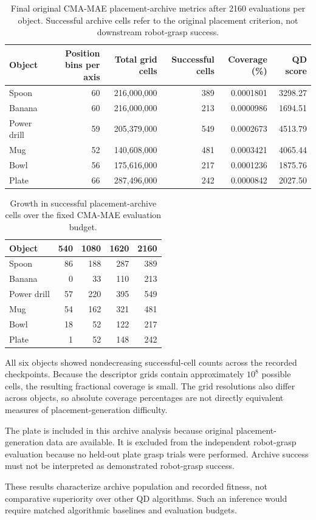 \begin{table}[t]
\centering
\caption{Final original CMA-MAE placement-archive metrics after 2160 evaluations per object. Successful archive cells refer to the original placement criterion, not downstream robot-grasp success.}
\label{tab:qd_archive_results}
\small
\begin{tabular}{lrrrrr}
\hline
Object & Position bins per axis & Total grid cells & Successful cells & Coverage (\%) & QD score \\
\hline
Spoon & 60 & 216,000,000 & 389 & 0.0001801 & 3298.27 \\
Banana & 60 & 216,000,000 & 213 & 0.0000986 & 1694.51 \\
Power drill & 59 & 205,379,000 & 549 & 0.0002673 & 4513.79 \\
Mug & 52 & 140,608,000 & 481 & 0.0003421 & 4065.44 \\
Bowl & 56 & 175,616,000 & 217 & 0.0001236 & 1875.76 \\
Plate & 66 & 287,496,000 & 242 & 0.0000842 & 2027.50 \\
\hline
\end{tabular}
\end{table}

\begin{table}[t]
\centering
\caption{Growth in successful placement-archive cells over the fixed CMA-MAE evaluation budget.}
\label{tab:qd_archive_growth}
\small
\begin{tabular}{lrrrr}
\hline
Object & 540 & 1080 & 1620 & 2160 \\
\hline
Spoon & 86 & 188 & 287 & 389 \\
Banana & 0 & 33 & 110 & 213 \\
Power drill & 57 & 220 & 395 & 549 \\
Mug & 54 & 162 & 321 & 481 \\
Bowl & 18 & 52 & 122 & 217 \\
Plate & 1 & 52 & 148 & 242 \\
\hline
\end{tabular}
\end{table}

All six objects showed nondecreasing successful-cell counts across the recorded checkpoints. Because the descriptor grids contain approximately $10^8$ possible cells, the resulting fractional coverage is small. The grid resolutions also differ across objects, so absolute coverage percentages are not directly equivalent measures of placement-generation difficulty.

The plate is included in this archive analysis because original placement-generation data are available. It is excluded from the independent robot-grasp evaluation because no held-out plate grasp trials were performed. Archive success must not be interpreted as demonstrated robot-grasp success.

These results characterize archive population and recorded fitness, not comparative superiority over other QD algorithms. Such an inference would require matched algorithmic baselines and evaluation budgets.
